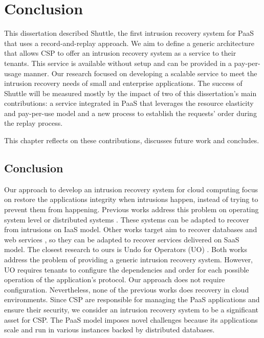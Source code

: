 \chapter{Conclusion}\label{chapter:conclusion}
This dissertation described Shuttle, the first intrusion recovery system for \acf{PaaS} that uses a record-and-replay approach. We aim to define a generic architecture that allows \acf{CSP} to offer an intrusion recovery system as a service to their tenants. This service is available without setup and can be provided in a pay-per-usage manner. Our research focused on developing a scalable service to meet the intrusion recovery needs of small and enterprise applications. The success of Shuttle will be measured mostly by the impact of two of this dissertation's main contributions: a service integrated in \ac{PaaS} that leverages the resource elasticity and pay-per-use model and a new process to establish the requests' order during the replay process.

This chapter reflects on these contributions, discusses future work and concludes.

\section{Conclusion}\label{sec:conclusion:conclusion}
Our approach to develop an intrusion recovery system for cloud computing focus on restore the applications integrity when intrusions happen, instead of trying to prevent them from happening. Previous works address this problem on operating system level \cite{taser,retro} or distributed systems \cite{aire}. These systems can be adapted to recover from intrusions on \acf{IaaS} model. Other works target aim to recover databases \cite{itdb,phoenix} and web services \cite{warp,goel,aire}, so they can be adapted to recover services delivered on \acf{SaaS} model. The closest research to ours is Undo for Operators (UO) \cite{undoForOperators}. Both works address the problem of providing a generic intrusion recovery system. However, UO requires tenants to configure the dependencies and order for each possible operation of the application's protocol. Our approach does not require configuration. Nevertheless, none of the previous works does recovery in cloud environments. Since \ac{CSP} are responsible for managing the \ac{PaaS} applications and ensure their security, we consider an intrusion recovery system to be a significant asset for \acf{CSP}. The \ac{PaaS} model imposes novel challenges because its applications scale and run in various instances backed by distributed databases. \\

